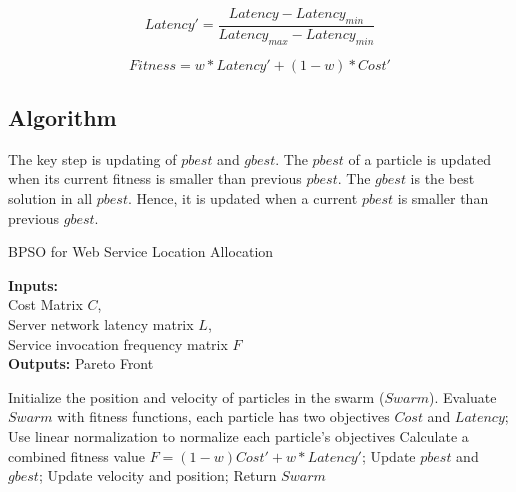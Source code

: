  \begin{equation}
 	\label{eq:latency_prime}
 	Latency' = \frac{Latency - Latency_{min}}{Latency_{max} - Latency_{min}}
 \end{equation}

\begin{equation}
\label{eq:Fitness}
	Fitness = w * Latency' + (1 - w) * Cost'
\end{equation}

\subsection{Algorithm}
The key step is updating of $pbest$ and $gbest$. The $pbest$ of a particle is updated when its current fitness is smaller than previous $pbest$.  
The $gbest$ is the best solution in all $pbest$. Hence, it is updated when a current $pbest$ is smaller than previous $gbest$. 

\begin{minipage}{1.0\linewidth}
 \begin{algorithm}[H]
 \footnotesize
	\caption{BPSO for Web Service Location Allocation}
	\textbf{Inputs:} \\
		Cost Matrix $C$, \\
		Server network latency matrix $L$, \\
		Service invocation frequency matrix $F$ \\

	\textbf{Outputs:}
		Pareto Front

	\begin{algorithmic}[1]
	\State Initialize the position and velocity of particles in the swarm ($Swarm$).
	\Repeat
	  \State Evaluate $Swarm$ with fitness functions, each particle has two objectives $Cost$ and $Latency$;
	  \State Use linear normalization to normalize each particle's objectives
	  \State Calculate a combined fitness value $F = (1 - w) Cost' + w * Latency' $;
	  \State Update $pbest$ and $gbest$;
	  \State Update velocity and position;
	\State Return $Swarm$
	\end{algorithmic}
	\label{alg:BPSO}
\end{algorithm}
\end{minipage}



 
